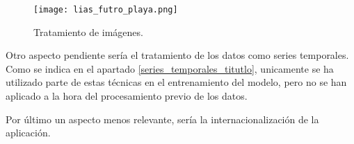 \begin{figure}%
	\centering
	\texttt{[image: lias\_futro\_playa.png]}
	\caption[Tratamiento de imágenes]{Tratamiento de imágenes.}\label{tImg}
\end{figure}


Otro aspecto pendiente sería el tratamiento de los datos como series temporales. Como se indica en el apartado \ref{series_temporales_titutlo}, unicamente se ha utilizado parte de estas técnicas en el entrenamiento del modelo, pero no se han aplicado a la hora del procesamiento previo de los datos.

Por último un aspecto menos relevante, sería la internacionalización de la aplicación. 